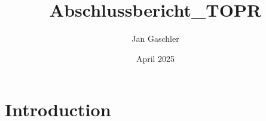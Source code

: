 \documentclass{article}
\title{Abschlussbericht_TOPR}
\author{Jan Gaschler}
\date{April 2025}
\begin{document}
\maketitle

\section{Introduction}
\end{document}
